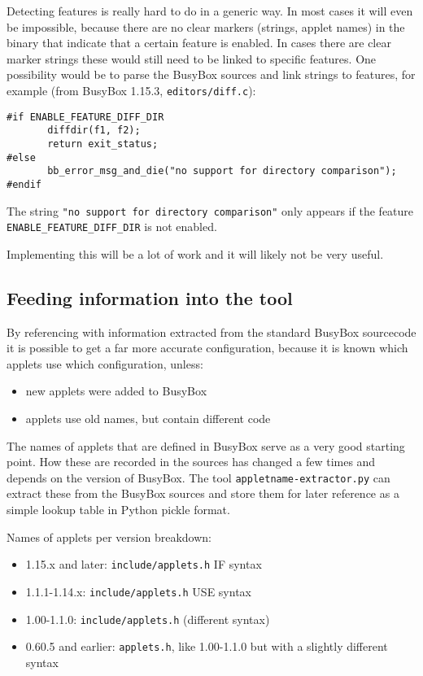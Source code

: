 \documentclass[10pt]{article}
\begin{document}
Detecting features is really hard to do in a generic way. In most cases it will
even be impossible, because there are no clear markers (strings, applet names)
in the binary that indicate that a certain feature is enabled. In cases there
are clear marker strings these would still need to be linked to specific
features. One possibility would be to parse the BusyBox sources and link
strings to features, for example (from BusyBox 1.15.3,
\texttt{editors/diff.c}):

\begin{verbatim}
#if ENABLE_FEATURE_DIFF_DIR
       diffdir(f1, f2);
       return exit_status;
#else
       bb_error_msg_and_die("no support for directory comparison");
#endif
\end{verbatim}

The string \texttt{"no support for directory comparison"} only appears if the
feature \texttt{ENABLE\_FEATURE\_DIFF\_DIR} is not enabled.

Implementing this will be a lot of work and it will likely not be very useful.

\subsection{Feeding information into the tool}

By referencing with information extracted from the standard BusyBox sourcecode
it is possible to get a far more accurate configuration, because it is known
which applets use which configuration, unless:

\begin{itemize}
\item new applets were added to BusyBox
\item applets use old names, but contain different code
\end{itemize}

The names of applets that are defined in BusyBox serve as a very good starting
point. How these are recorded in the sources has changed a few times and
depends on the version of BusyBox. The tool \texttt{appletname-extractor.py}
can extract these from the BusyBox sources and store them for later reference
as a simple lookup table in Python pickle format.

Names of applets per version breakdown:

\begin{itemize}
\item 1.15.x and later: \texttt{include/applets.h} IF syntax
\item 1.1.1-1.14.x: \texttt{include/applets.h} USE syntax
\item 1.00-1.1.0: \texttt{include/applets.h} (different syntax)
\item 0.60.5 and earlier: \texttt{applets.h}, like 1.00-1.1.0 but with a
slightly different syntax
\end{itemize}
\end{document}
